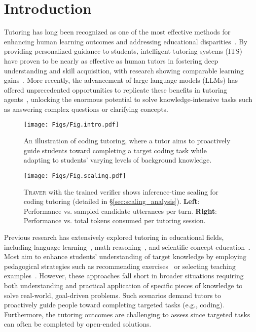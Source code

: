 \section{Introduction}

Tutoring has long been recognized as one of the most effective methods for enhancing human learning outcomes and addressing educational disparities~\citep{hill2005effects}. 
By providing personalized guidance to students, intelligent tutoring systems (ITS) have proven to be nearly as effective as human tutors in fostering deep understanding and skill acquisition, with research showing comparable learning gains~\citep{vanlehn2011relative,rus2013recent}.
More recently, the advancement of large language models (LLMs) has offered unprecedented opportunities to replicate these benefits in tutoring agents~\citep{dan2023educhat,jin2024teach,chen2024empowering}, unlocking the enormous potential to solve knowledge-intensive tasks such as answering complex questions or clarifying concepts.


\begin{figure}[t!]
\centering
\texttt{[image: Figs/Fig.intro.pdf]}
\caption{An illustration of coding tutoring, where a tutor aims to proactively guide students toward completing a target coding task while adapting to students' varying levels of background knowledge. \vspace{-5pt}}
\label{fig:example}
\end{figure}

\begin{figure}[t!]
\centering
\texttt{[image: Figs/Fig.scaling.pdf]}
\caption{\textsc{Traver} with the trained verifier shows inference-time scaling for coding tutoring (detailed in \S\ref{sec:scaling_analysis}). \textbf{Left}: Performance vs. sampled candidate utterances per turn. \textbf{Right}: Performance vs. total tokens consumed per tutoring session. \vspace{-15pt}}
\label{fig:scale}
\end{figure}


Previous research has extensively explored tutoring in educational fields, including language learning~\cite{swartz2012intelligent,stasaski-etal-2020-cima}, math reasoning~\cite{demszky-hill-2023-ncte,macina-etal-2023-mathdial}, and scientific concept education~\cite{yuan-etal-2024-boosting,yang2024leveraging}. 
Most aim to enhance students' understanding of target knowledge by employing pedagogical strategies such as recommending exercises~\cite{deng2023towards} or selecting teaching examples~\cite{ross-andreas-2024-toward}. 
However, these approaches fall short in broader situations requiring both understanding and practical application of specific pieces of knowledge to solve real-world, goal-driven problems. 
Such scenarios demand tutors to proactively guide people toward completing targeted tasks (e.g., coding).
Furthermore, the tutoring outcomes are challenging to assess since targeted tasks can often be completed by open-ended solutions.



